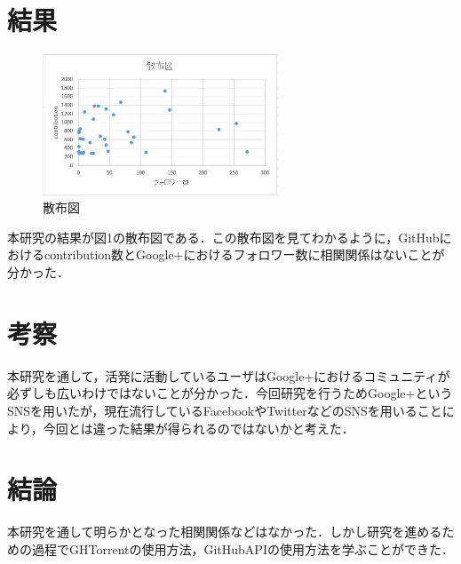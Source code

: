 \documentclass[uplatex,twocolumn,dvipdfmx]{jsarticle}
\begin{document}
\section{結果}

\begin{figure}[htb]
\centering
\includegraphics[width=7cm]{sanpu.jpg}
\caption{散布図}\label{サンプル図}
\end{figure}
本研究の結果が図1の散布図である．この散布図を見てわかるように，GitHubにおけるcontribution数とGoogle+におけるフォロワー数に相関関係はないことが分かった．

\section{考察}

本研究を通して，活発に活動しているユーザはGoogle+におけるコミュニティが必ずしも広いわけではないことが分かった．今回研究を行うためGoogle+というSNSを用いたが，現在流行しているFacebookやTwitterなどのSNSを用いることにより，今回とは違った結果が得られるのではないかと考えた．

\section{結論}

本研究を通して明らかとなった相関関係などはなかった．しかし研究を進めるための過程でGHTorrentの使用方法，GitHubAPIの使用方法を学ぶことができた．




\end{document}
